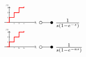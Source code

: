 \begin{footnotesize}
\[\begin{array}{@{}l@{ ~ \laplace ~ }l@{}}
\begin{tikzpicture}[domain=0:5, scale=\graphtabscale, every node/.style={scale=\graphtabscale}]
    \draw[->] (-1,0) -- (5.5,0) node[below] {$t$};
    \draw[->] (0,-0.1) -- (0,3.2) node[above left] {$f(t)$};
    \draw[-] (-0.1,1) node[left] {$1$} -- (0.1,1);
    \draw[-] (-0.1,2) node[left] {$2$} -- (0.1,2);
    \draw[-] (-0.1,3) node[left] {$3$} -- (0.1,3);
    \draw[thick, red]
        (-0.5,0)
        --
        (0,0)
        --
        (0,1)
        --
        (1,1)
        --
        (1,2)
        --
        (2,2)
        --
        (2,3)
        --
        (3,3)
        --
        (3,3.2);
    \draw (1,0) node[below] {$1$};
    \draw (2,0) node[below] {$2$};
    \draw (3,0) node[below] {$3$};
\end{tikzpicture} &
    \frac{1}{s (1 - e^{-s})} \\
\begin{tikzpicture}[domain=0:5, scale=\graphtabscale, every node/.style={scale=\graphtabscale}]
    \draw[->] (-1,0) -- (5.5,0) node[below] {$t$};
    \draw[->] (0,-0.1) -- (0,3.2) node[above left] {$f(t)$};
    \draw[-] (-0.1,1) node[left] {$1$} -- (0.1,1);
    \draw[-] (-0.1,2) node[left] {$2$} -- (0.1,2);
    \draw[-] (-0.1,3) node[left] {$3$} -- (0.1,3);
    \draw[thick, red]
        (-0.5,0)
        --
        (0,0)
        --
        (0,1)
        --
        (1,1)
        --
        (1,2)
        --
        (2,2)
        --
        (2,3)
        --
        (3,3)
        --
        (3,3.2);
    \draw (1,0) node[below] {$a$};
    \draw (2,0) node[below] {$2a$};
    \draw (3,0) node[below] {$3a$};
\end{tikzpicture} &
    \frac{1}{s (1 - e^{-as})} \\
\end{array} \]


\end{footnotesize}
